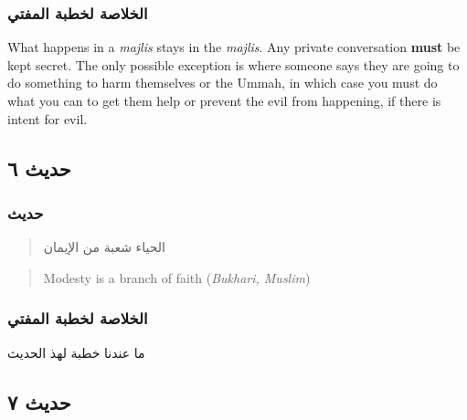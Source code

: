\documentclass[
]{book}
\begin{document}
\hypertarget{ux627ux644ux62eux644ux627ux635ux629-ux644ux62eux637ux628ux629-ux627ux644ux645ux641ux62aux64a-4}{%
\subsubsection{الخلاصة لخطبة المفتي}\label{ux627ux644ux62eux644ux627ux635ux629-ux644ux62eux637ux628ux629-ux627ux644ux645ux641ux62aux64a-4}}

What happens in a \emph{majlis} stays in the \emph{majlis}. Any private conversation \textbf{must} be kept secret. The only possible exception is where someone says they are going to do something to harm themselves or the Ummah, in which case you must do what you can to get them help or prevent the evil from happening, if there is intent for evil.

\hypertarget{ux62dux62fux64aux62b-ux666}{%
\subsection{حديث ٦}\label{ux62dux62fux64aux62b-ux666}}

\hypertarget{ux62dux62fux64aux62b-5}{%
\subsubsection{حديث}\label{ux62dux62fux64aux62b-5}}

\begin{quote}
الحياء شعبة من الإيمان
\end{quote}

\begin{quote}
Modesty is a branch of faith (\emph{Bukhari, Muslim})
\end{quote}

\hypertarget{ux627ux644ux62eux644ux627ux635ux629-ux644ux62eux637ux628ux629-ux627ux644ux645ux641ux62aux64a-5}{%
\subsubsection{الخلاصة لخطبة المفتي}\label{ux627ux644ux62eux644ux627ux635ux629-ux644ux62eux637ux628ux629-ux627ux644ux645ux641ux62aux64a-5}}

ما عندنا خطبة لهذ الحديث

\hypertarget{ux62dux62fux64aux62b-ux667}{%
\subsection{حديث ٧}\label{ux62dux62fux64aux62b-ux667}}
\end{document}
